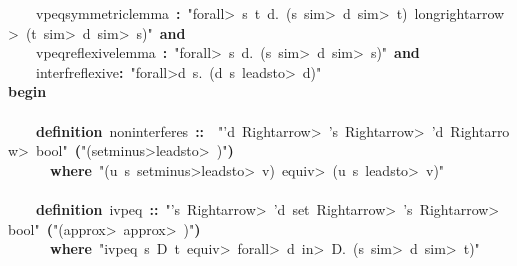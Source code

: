 \documentclass{article}
\newcommand{\syntaxKEYWORDA}[1]{\textcolor[rgb]{0.0,0.4,0.6}{\textbf{#1}}}
\newcommand{\syntaxKEYWORDB}[1]{\textcolor[rgb]{0.0,0.6,0.4}{\textbf{#1}}}
\newcommand{\syntaxLITERALA}[1]{\textcolor[rgb]{1.0,0.0,0.8}{#1}}
\newcommand{\syntaxOPERATOR}[1]{\textcolor[rgb]{0.0,0.0,0.0}{\textbf{#1}}}
\newcommand{\syntaxKEYWORDA}[1]{\textcolor[rgb]{0.0,0.4,0.6}{\textbf{#1}}}
\newcommand{\syntaxKEYWORDB}[1]{\textcolor[rgb]{0.0,0.6,0.4}{\textbf{#1}}}
\newcommand{\syntaxLITERALA}[1]{\textcolor[rgb]{1.0,0.0,0.8}{#1}}
\newcommand{\syntaxOPERATOR}[1]{\textcolor[rgb]{0.0,0.0,0.0}{\textbf{#1}}}
\newcommand{\syntaxKEYWORDA}[1]{\textcolor[rgb]{0.0,0.4,0.6}{\textbf{#1}}}
\newcommand{\syntaxKEYWORDB}[1]{\textcolor[rgb]{0.0,0.6,0.4}{\textbf{#1}}}
\newcommand{\syntaxLITERALA}[1]{\textcolor[rgb]{1.0,0.0,0.8}{#1}}
\newcommand{\syntaxOPERATOR}[1]{\textcolor[rgb]{0.0,0.0,0.0}{\textbf{#1}}}
\newcommand{\syntaxKEYWORDA}[1]{\textcolor[rgb]{0.0,0.4,0.6}{#1}}
\newcommand{\syntaxKEYWORDB}[1]{\textcolor[rgb]{0.0,0.6,0.4}{#1}}
\newcommand{\syntaxLITERALA}[1]{\textcolor[rgb]{1.0,0.0,0.8}{\textbf{#1}}}
\newcommand{\syntaxOPERATOR}[1]{\textcolor[rgb]{0.0,0.0,0.0}{#1}}
\newcommand{\syntaxKEYWORDA}[1]{\textcolor[rgb]{0.0,0.4,0.6}{\textbf{#1}}}
\newcommand{\syntaxKEYWORDB}[1]{\textcolor[rgb]{0.0,0.6,0.4}{\textbf{#1}}}
\newcommand{\syntaxLITERALA}[1]{\textcolor[rgb]{1.0,0.0,0.8}{#1}}
\newcommand{\syntaxOPERATOR}[1]{\textcolor[rgb]{0.0,0.0,0.0}{\textbf{#1}}}
\newcommand{\syntaxKEYWORDA}[1]{\textcolor[rgb]{0.0,0.4,0.6}{\textbf{#1}}}
\newcommand{\syntaxKEYWORDB}[1]{\textcolor[rgb]{0.0,0.6,0.4}{\textbf{#1}}}
\newcommand{\syntaxLITERALA}[1]{\textcolor[rgb]{1.0,0.0,0.8}{#1}}
\newcommand{\syntaxOPERATOR}[1]{\textcolor[rgb]{0.0,0.0,0.0}{\textbf{#1}}}
\begin{document}
{\ }{\ }{\ }{\ }vpeq\usebox{\underscorebox}symmetric\usebox{\underscorebox}lemma{\ }\syntaxOPERATOR{:}{\ }\syntaxLITERALA{"\<forall>{\ }s{\ }t{\ }d.{\ }(s{\ }\<sim>{\ }d{\ }\<sim>{\ }t){\ }\<longrightarrow>{\ }(t{\ }\<sim>{\ }d{\ }\<sim>{\ }s)"}{\ }\syntaxKEYWORDB{and}\hspace*{\fill}\\
{\ }{\ }{\ }{\ }vpeq\usebox{\underscorebox}reflexive\usebox{\underscorebox}lemma{\ }\syntaxOPERATOR{:}{\ }\syntaxLITERALA{"\<forall>{\ }s{\ }d.{\ }(s{\ }\<sim>{\ }d{\ }\<sim>{\ }s)"}{\ }\syntaxKEYWORDB{and}\hspace*{\fill}\\
{\ }{\ }{\ }{\ }interf\usebox{\underscorebox}reflexive\syntaxOPERATOR{:}{\ }\syntaxLITERALA{"\<forall>d{\ }s.{\ }(d{\ }\usebox{\atbox}{\ }s{\ }\<leadsto>{\ }d)"}{\ }\hspace*{\fill}\\
\syntaxKEYWORDB{begin}\hspace*{\fill}\\
{\ }{\ }{\ }\hspace*{\fill}\\
{\ }{\ }{\ }{\ }\syntaxKEYWORDA{definition}{\ }non\usebox{\underscorebox}interferes{\ }\syntaxOPERATOR{::}{\ }{\ }\syntaxLITERALA{"'d{\ }\<Rightarrow>{\ }'s{\ }\<Rightarrow>{\ }'d{\ }\<Rightarrow>{\ }bool"}{\ }\syntaxOPERATOR{(}\syntaxLITERALA{"(\usebox{\underscorebox}{\ }\usebox{\atbox}{\ }\usebox{\underscorebox}{\ }\<setminus>\<leadsto>{\ }\usebox{\underscorebox})"}\syntaxOPERATOR{)}\hspace*{\fill}\\
{\ }{\ }{\ }{\ }{\ }{\ }\syntaxKEYWORDB{where}{\ }\syntaxLITERALA{"(u{\ }\usebox{\atbox}{\ }s{\ }\<setminus>\<leadsto>{\ }v){\ }\<equiv>{\ }(u{\ }\usebox{\atbox}{\ }s{\ }\<leadsto>{\ }v)"}\hspace*{\fill}\\
\hspace*{\fill}\\
{\ }{\ }{\ }{\ }\syntaxKEYWORDA{definition}{\ }ivpeq{\ }\syntaxOPERATOR{::}{\ }\syntaxLITERALA{"'s{\ }\<Rightarrow>{\ }'d{\ }set{\ }\<Rightarrow>{\ }'s{\ }\<Rightarrow>{\ }bool"}{\ }\syntaxOPERATOR{(}\syntaxLITERALA{"(\usebox{\underscorebox}{\ }\<approx>{\ }\usebox{\underscorebox}{\ }\<approx>{\ }\usebox{\underscorebox})"}\syntaxOPERATOR{)}\hspace*{\fill}\\
{\ }{\ }{\ }{\ }{\ }{\ }\syntaxKEYWORDB{where}{\ }\syntaxLITERALA{"ivpeq{\ }s{\ }D{\ }t{\ }\<equiv>{\ }\<forall>{\ }d{\ }\<in>{\ }D.{\ }(s{\ }\<sim>{\ }d{\ }\<sim>{\ }t)"}\hspace*{\fill}\\
\end{document}
